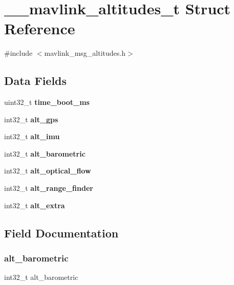 \section{\+\_\+\+\_\+mavlink\+\_\+altitudes\+\_\+t Struct Reference}
\label{struct____mavlink__altitudes__t}


{\ttfamily \#include $<$mavlink\+\_\+msg\+\_\+altitudes.\+h$>$}

\subsection*{Data Fields}
\begin{DoxyCompactItemize}
\item 
uint32\+\_\+t \textbf{ time\+\_\+boot\+\_\+ms}
\item 
int32\+\_\+t \textbf{ alt\+\_\+gps}
\item 
int32\+\_\+t \textbf{ alt\+\_\+imu}
\item 
int32\+\_\+t \textbf{ alt\+\_\+barometric}
\item 
int32\+\_\+t \textbf{ alt\+\_\+optical\+\_\+flow}
\item 
int32\+\_\+t \textbf{ alt\+\_\+range\+\_\+finder}
\item 
int32\+\_\+t \textbf{ alt\+\_\+extra}
\end{DoxyCompactItemize}


\subsection{Field Documentation}
\mbox{\label{struct____mavlink__altitudes__t_a1f98b0561c9bb8a957c283951e4a4666}} 
\subsubsection{alt\+\_\+barometric}
{\footnotesize\ttfamily int32\+\_\+t alt\+\_\+barometric}

\mbox{\label{struct____mavlink__altitudes__t_abc51d71e9fb9cb63ea8428ca5833d085}} 
